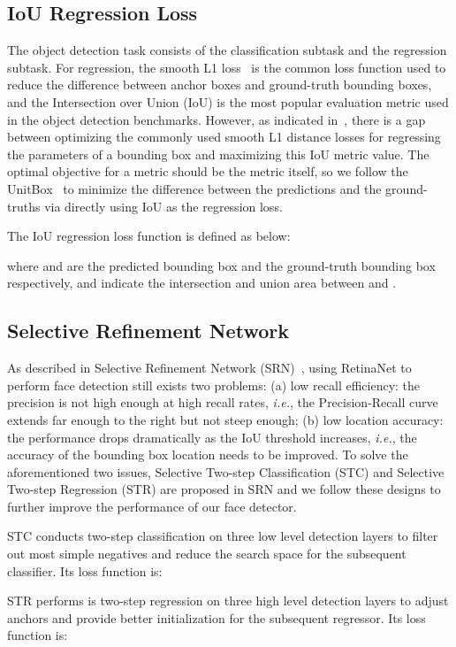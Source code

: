 \documentclass{article} \usepackage{nips13submit_e,times}
\def\ie{{\em i.e.}}
\begin{document}
\subsection{IoU Regression Loss}
The object detection task consists of the classification subtask and the regression subtask. For regression, the smooth L1 loss~\cite{DBLP:conf/iccv/Girshick15} is the common loss function used to reduce the difference between anchor boxes and ground-truth bounding boxes, and the Intersection over Union (IoU) is the most popular evaluation metric used in the object detection benchmarks. However, as indicated in~\cite{rezatofighi2019generalized}, there is a gap between optimizing the commonly used smooth L1 distance losses for regressing the parameters of a bounding box and maximizing this IoU metric value. The optimal objective for a metric should be the metric itself, so we follow the UnitBox~\cite{DBLP:conf/mm/YuJWCH16} to minimize the difference between the predictions and the ground-truths via directly using IoU as the regression loss.

The IoU regression loss function is defined as below:

where  and  are the predicted bounding box and the ground-truth bounding box respectively,  and  indicate the intersection and union area between  and .

\subsection{Selective Refinement Network}
As described in Selective Refinement Network (SRN)~\cite{DBLP:journals/corr/abs-1809-02693}, using RetinaNet to perform face detection still exists two problems: (a) low recall efficiency: the precision is not high enough at high recall rates, \ie, the Precision-Recall curve extends far enough to the right but not steep enough; (b) low location accuracy: the performance drops dramatically as the IoU threshold increases, \ie, the accuracy of the bounding box location needs to be improved. To solve the aforementioned two issues, Selective Two-step Classification (STC) and Selective Two-step Regression (STR) are proposed in SRN and we follow these designs to further improve the performance of our face detector.

STC conducts two-step classification on three low level detection layers to filter out most simple negatives and reduce the search space for the subsequent classifier. Its loss function is:

STR performs is two-step regression on three high level detection layers to adjust anchors and provide better initialization for the subsequent regressor. Its loss function is: 
\end{document}
